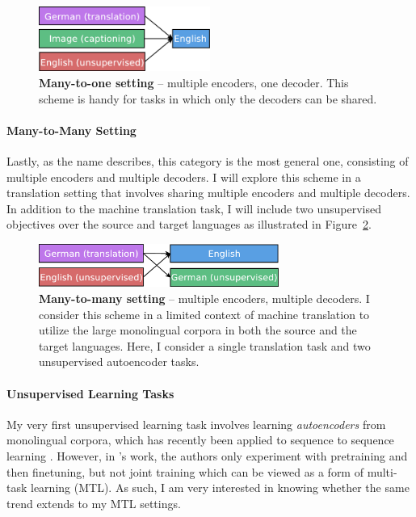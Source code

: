 \begin{figure}[tbh]
\centering
\includegraphics[width=0.5\textwidth, clip=true, trim= 0 0 0
0]{img/6-1_mto}
\caption[Many-to-one setting]{{\bf Many-to-one setting} -- multiple encoders, one decoder. This scheme
is handy for tasks in which only the decoders can be shared.}
\label{f:mto}
\end{figure}

\paragraph{Many-to-Many Setting}
Lastly, as the name describes, this category is the most general one,
consisting of multiple encoders and multiple decoders.
I will explore this scheme in a translation setting that involves sharing multiple
encoders and multiple decoders.  In addition to the machine
translation task, I will include two unsupervised 
objectives over the source and target languages as illustrated in
Figure~\ref{f:mtm}.

\begin{figure}[tbh]
\centering
\includegraphics[width=0.7\textwidth, clip=true, trim= 0 0 0
0]{img/6-1_mtm}
\caption[Many-to-many setting]{{\bf Many-to-many setting} -- multiple encoders, multiple decoders. I
consider this scheme in a limited context of machine translation to utilize the large
monolingual corpora in both the source and the target languages. Here, I
consider a single translation task and two unsupervised autoencoder tasks.} 
\label{f:mtm}
\end{figure}

\paragraph{Unsupervised Learning Tasks}

My very first unsupervised learning task involves learning {\it autoencoders} from
monolingual corpora, which has recently been applied to sequence to sequence
learning \citep{dai15}. However, in \citet{dai15}'s work, the authors
only experiment with pretraining and then finetuning, but not joint training which
can be viewed as a form of multi-task learning (MTL). As such, I am 
very interested in knowing whether the same trend extends to my MTL settings.


